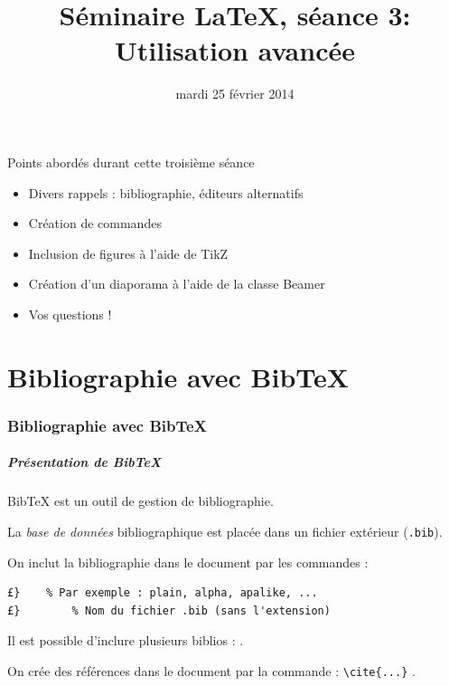 \documentclass{beamer}
\title[Séminaire \LaTeX, séance 3]{Séminaire \LaTeX, séance 3: Utilisation avancée}
\date{mardi 25 février 2014}
\begin{document}

\begin{frame}
    \titlepage
\end{frame}


\begin{frame}{Points abordés durant cette troisième séance}
  \begin{itemize}
    \item Divers rappels : bibliographie, éditeurs alternatifs
    \item Création de commandes
    \item Inclusion de figures à l'aide de TikZ
    \item Création d'un diaporama à l'aide de la classe Beamer
    \item Vos questions !
  \end{itemize}
\end{frame}






\part{Bibliographie avec BibTeX}



\section{Bibliographie avec BibTeX}


\begin{frame}[fragile]
\frametitle{Présentation de BibTeX}
BibTeX est un outil de gestion de bibliographie.

\medskip
La \emph{base de données} bibliographique est placée dans un fichier extérieur (\lstinline?.bib?).

\medskip
On inclut la bibliographie dans le document par les commandes :
\begin{lstlisting}
£}    % Par exemple : plain, alpha, apalike, ...
£}        % Nom du fichier .bib (sans l'extension)
\end{lstlisting}
Il est possible d'inclure plusieurs biblios :
\lstinline??.

\medskip
On crée des références dans le document par la commande : \lstinline?\cite{...}?  \cite{latexcompanion}.
\end{frame}
\end{document}
